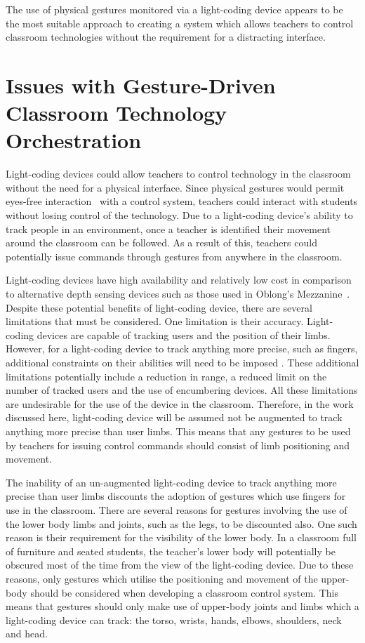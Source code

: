 \documentclass[link]{IWCOMP}
\begin{document}
The use of physical gestures monitored via a light-coding device appears to be the most suitable approach to creating a system which allows teachers to control classroom technologies without the requirement for a distracting interface.

\section{Issues with Gesture-Driven Classroom Technology Orchestration} 
\label{sec:issues}

Light-coding devices could allow teachers to control technology in the classroom without the need for a physical interface.
Since physical gestures would permit eyes-free interaction~\citep{Brewster2003} with a control system, teachers could interact with students without losing control of the technology.
Due to a light-coding device's ability to track people in an environment, once a teacher is identified their movement around the classroom can be followed.
As a result of this, teachers could potentially issue commands through gestures from anywhere in the classroom.

Light-coding devices have high availability and relatively low cost in comparison to alternative depth sensing devices such as those used in Oblong's Mezzanine~\citep{kramer2011}.
Despite these potential benefits of light-coding device, there are several limitations that must be considered.
One limitation is their accuracy.
Light-coding devices are capable of tracking users and the position of their limbs.
However, for a light-coding device to track anything more precise, such as fingers, additional constraints on their abilities will need to be imposed \citep{Clark2011}.
These additional limitations potentially include a reduction in range, a reduced limit on the number of tracked users and the use of encumbering devices.
All these limitations are undesirable for the use of the device in the classroom.
Therefore, in the work discussed here, light-coding device will be assumed not be augmented to track anything more precise than user limbs.
This means that any gestures to be used by teachers for issuing control commands should consist of limb positioning and movement.

The inability of an un-augmented light-coding device to track anything more precise than user limbs discounts the adoption of gestures which use fingers for use in the classroom.
There are several reasons for gestures involving the use of the lower body limbs and joints, such as the legs, to be discounted also.
One such reason is their requirement for the visibility of the lower body.
In a classroom full of furniture and seated students, the teacher's lower body will potentially be obscured most of the time from the view of the light-coding device.
Due to these reasons, only gestures which utilise the positioning and movement of the upper-body should be considered when developing a classroom control system.
This means that gestures should only make use of upper-body joints and limbs which a light-coding device can track: the torso, wrists, hands, elbows, shoulders, neck and head.
\end{document}
